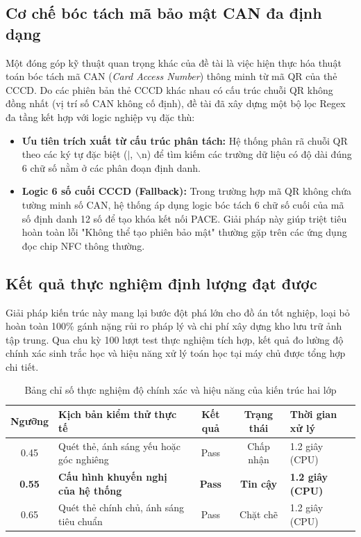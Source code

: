 \documentclass[../DoAn.tex]{subfiles}
\begin{document}
\subsection{Cơ chế bóc tách mã bảo mật CAN đa định dạng}

Một đóng góp kỹ thuật quan trọng khác của đề tài là việc hiện thực hóa thuật toán bóc tách mã CAN (\textit{Card Access Number}) thông minh từ mã QR của thẻ CCCD. Do các phiên bản thẻ CCCD khác nhau có cấu trúc chuỗi QR không đồng nhất (vị trí số CAN không cố định), đề tài đã xây dựng một bộ lọc Regex đa tầng kết hợp với logic nghiệp vụ đặc thù:
\begin{itemize}
    \item \textbf{Ưu tiên trích xuất từ cấu trúc phân tách:} Hệ thống phân rã chuỗi QR theo các ký tự đặc biệt ($|$, $\backslash$n) để tìm kiếm các trường dữ liệu có độ dài đúng 6 chữ số nằm ở các phân đoạn định danh.
    \item \textbf{Logic 6 số cuối CCCD (Fallback):} Trong trường hợp mã QR không chứa tường minh số CAN, hệ thống áp dụng logic bóc tách 6 chữ số cuối của mã số định danh 12 số để tạo khóa kết nối PACE. Giải pháp này giúp triệt tiêu hoàn toàn lỗi "Không thể tạo phiên bảo mật" thường gặp trên các ứng dụng đọc chip NFC thông thường.
\end{itemize}

\subsection{Kết quả thực nghiệm định lượng đạt được}

Giải pháp kiến trúc này mang lại bước đột phá lớn cho đồ án tốt nghiệp, loại bỏ hoàn toàn 100\% gánh nặng rủi ro pháp lý và chi phí xây dựng kho lưu trữ ảnh tập trung. Qua chu kỳ 100 lượt test thực nghiệm tích hợp, kết quả đo lường độ chính xác sinh trắc học và hiệu năng xử lý toán học tại máy chủ được tổng hợp chi tiết.

\begin{table}[ht!]
\centering
\small
\renewcommand{\arraystretch}{1.3}
\caption{Bảng chỉ số thực nghiệm độ chính xác và hiệu năng của kiến trúc hai lớp}
\label{tab:biometrics_performance}
\begin{tabular}{|c|p{4.5cm}|c|c|p{3.5cm}|}
\hline
\textbf{Ngưỡng} & \textbf{Kịch bản kiểm thử thực tế} & \textbf{Kết quả} & \textbf{Trạng thái} & \textbf{Thời gian xử lý} \\ \hline
0.45 & Quét thẻ, ánh sáng yếu hoặc góc nghiêng & Pass & Chấp nhận & 1.2 giây (CPU) \\ \hline
\textbf{0.55} & \textbf{Cấu hình khuyến nghị của hệ thống} & \textbf{Pass} & \textbf{Tin cậy} & \textbf{1.2 giây (CPU)} \\ \hline
0.65 & Quét thẻ chính chủ, ánh sáng tiêu chuẩn & Pass & Chặt chẽ & 1.2 giây (CPU) \\ \hline
\end{tabular}
\end{table}
\end{document}
